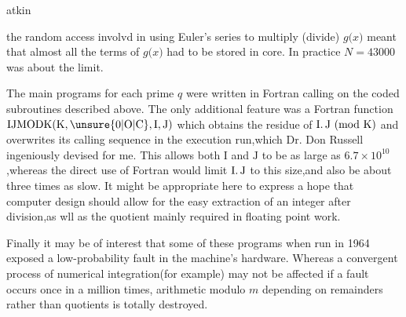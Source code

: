 \begin{flushright}
atkin 
\end{flushright}

\reversemarginpar the random access involv\margin{\handwritten{/}}d in using Euler's series to multiply (divide) \uline{$g(x$}$)$ meant that almost all the terms of \uline{$g(x$}$)$ had to be stored in core. In practice $N=43000$ was about the limit.

The main programs for each prime \uline{$q$} were written in Fortran calling on the coded subroutines described above. The only additional feature was a Fortran function $\mathrm{IJMODK}(\mathrm{K},\unsure{0|\mathrm{O}|\mathrm{C}},\mathrm{I},\mathrm{J})$ which obtains the residue of $\mathrm{I}\ldotp\mathrm{J}\ (\mathrm{mod}\ \mathrm{K})$ and overwrites its calling sequence in the\normalmarginpar{} execution run,which Dr. Don Russell ingeniously devised for me. This allows both $\mathrm{I}$ and $\mathrm{J}$ to be as large as $6.7\times10^{10}$,whereas the direct use of Fortran would limit $\mathrm{I}\ldotp\mathrm{J}$ to this size,and also be about three times as slow. It might be appropriate here to express a hope that computer design should allow for the easy extraction of an integer \uline{} after division,as \reversemarginpar w\margin{\handwritten{/}}ll as the quotient mainly required in floating point work.

Finally it may be of interest that some of these programs when run in 1964 exposed a low-probability  fault in the machine's hardware. Whereas a convergent process of numerical integration(for example) may not be affected if a fault occurs once in a million times, arithmetic modulo \uline{$m$} depending on remainders rather than quotients is totally destroyed.
\normalmarginpar
